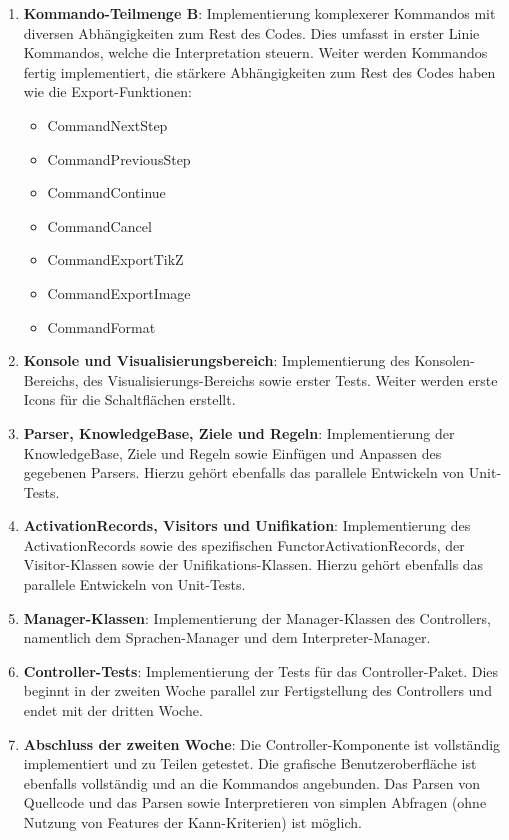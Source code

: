 \documentclass[parskip=full,11pt,twoside]{scrartcl}
\begin{document}
\begin{enumerate}
	\item \textbf{Kommando-Teilmenge B}: Implementierung komplexerer Kommandos mit diversen Abhängigkeiten zum Rest des Codes. Dies umfasst in erster Linie Kommandos, welche die Interpretation steuern. Weiter werden Kommandos fertig implementiert, die stärkere Abhängigkeiten zum Rest des Codes haben wie die Export-Funktionen:
	\begin{multicols}{3}
		\begin{itemize}
			\item CommandNextStep
			\item CommandPreviousStep
			\item CommandContinue
			\item CommandCancel
			
			\item CommandExportTikZ
			\item CommandExportImage
			\item CommandFormat
		\end{itemize}
	\end{multicols}

	\item \textbf{Konsole und Visualisierungsbereich}: Implementierung des Konsolen-Bereichs, des Visualisierungs-Bereichs sowie erster Tests. Weiter werden erste Icons für die Schaltflächen erstellt.

	\item \textbf{Parser, KnowledgeBase, Ziele und Regeln}: Implementierung der KnowledgeBase, Ziele und Regeln sowie Einfügen und Anpassen des gegebenen Parsers. Hierzu gehört ebenfalls das parallele Entwickeln von Unit-Tests.
	
	\item \textbf{ActivationRecords, Visitors und Unifikation}: Implementierung des ActivationRecords sowie des spezifischen FunctorActivationRecords, der Visitor-Klassen sowie der Unifikations-Klassen. Hierzu gehört ebenfalls das parallele Entwickeln von Unit-Tests.
	
	\item \textbf{Manager-Klassen}: Implementierung der Manager-Klassen des Controllers, namentlich dem Sprachen-Manager und dem Interpreter-Manager.
	
	\item \textbf{Controller-Tests}: Implementierung der Tests für das Controller-Paket. Dies beginnt in der zweiten Woche parallel zur Fertigstellung des Controllers und endet mit der dritten Woche.
	
	\item \textbf{Abschluss der zweiten Woche}: Die Controller-Komponente ist vollständig implementiert und zu Teilen getestet. Die grafische Benutzeroberfläche ist ebenfalls vollständig und an die Kommandos angebunden. Das Parsen von Quellcode und das Parsen sowie Interpretieren von simplen Abfragen (ohne Nutzung von Features der Kann-Kriterien) ist möglich.
	

\end{enumerate}
\end{document}
